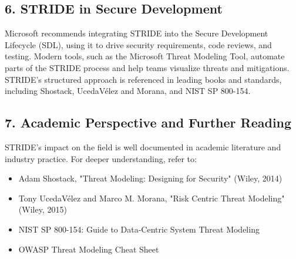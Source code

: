 \subsection*{6. STRIDE in Secure Development}
Microsoft recommends integrating STRIDE into the Secure Development Lifecycle (SDL), using it to drive security requirements, code reviews, and testing. Modern tools, such as the Microsoft Threat Modeling Tool, automate parts of the STRIDE process and help teams visualize threats and mitigations\cite{shostack2014,owasp}. STRIDE’s structured approach is referenced in leading books and standards, including Shostack\cite{shostack2014}, UcedaVélez and Morana\cite{uceda2015}, and NIST SP 800-154\cite{nist800154}.

\subsection*{7. Academic Perspective and Further Reading}
STRIDE’s impact on the field is well documented in academic literature and industry practice. For deeper understanding, refer to:
\begin{itemize}
	\item Adam Shostack, "Threat Modeling: Designing for Security" (Wiley, 2014)
	\item Tony UcedaVélez and Marco M. Morana, "Risk Centric Threat Modeling" (Wiley, 2015)
	\item NIST SP 800-154: Guide to Data-Centric System Threat Modeling
	\item OWASP Threat Modeling Cheat Sheet
\end{itemize}
